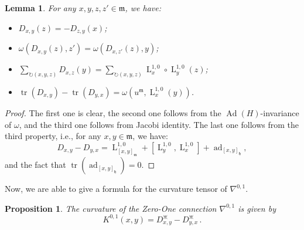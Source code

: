 \documentclass[preprint,12pt,1p]{elsarticle}
\theoremstyle{plain}
\newtheorem{proposition}[theorem]{Proposition}
\newtheorem{lemma}[theorem]{Lemma}
\theoremstyle{definition}
\newcommand{\ro}{\circ}
\newcommand{\n}{\nabla}
\newcommand{\nc}{\n^{0,1}}
\newcommand{\tr}{\operatorname{tr}}
\newcommand{\h}{\mathfrak{h}}
\newcommand{\m}{\mathfrak{m}}
\newcommand{\Ad}{\operatorname{Ad}}
\newcommand{\ad}{\operatorname{ad}}
\newcommand{\lm}{\operatorname{L}^{1,0}}
\numberwithin{equation}{section}
\newcommand{\aj}{\divideontimes}
\newcommand{\Kc}{K^{0,1}}
\begin{document}
\begin{lemma}\label{LemLY3} For any $x,y,z,z'\in\mathfrak{m}$, we have:
\begin{itemize}
\item[$1.$] $D_{x,y}(z)=-D_{z,y}(x)$;
\item[$2.$] $\omega\left(D_{x,y}(z),z'\right)=\omega\left(D_{x,z'}(z),y\right)$;
\item[$3.$] $\displaystyle\sum_{\circlearrowright(x,y,z)} D_{x,z}(y)=\displaystyle\sum_{\circlearrowright(x,y,z)}\lm_x\ro\lm_y(z)$;
\item[$4.$] $\tr\left(D_{x,y}\right)-\tr\left(D_{y,x}\right)=\omega\left(u^\mathfrak{m},\lm_x(y)\right)$.
\end{itemize}
\end{lemma}

\begin{proof}
The first one is clear, the second one follows from the $\Ad(H)$-invariance of $\omega$, and the third one follows from Jacobi identity. The last one follows from the third property, i.e., for any $x,y\in\mathfrak{m}$, we have:
\begin{equation*}
D_{x,y}-D_{y,x}=\lm_{[x,y]_\m}+\left[\lm_y,\lm_x\right]+\ad_{[x,y]_\h},
\end{equation*}
and the fact that $\tr\left(\ad_{[x,y]_\h}\right)=0$.
\end{proof}

Now, we are able to give a formula for the curvature tensor of $\nc$.

\begin{proposition}
The curvature of the Zero-One connection $\nc$ is given by
\begin{equation}\label{Ka}
\Kc(x,y)=D_{x,y}^\aj-D_{y,x}^\aj\,.
\end{equation}
\end{proposition}
\end{document}
